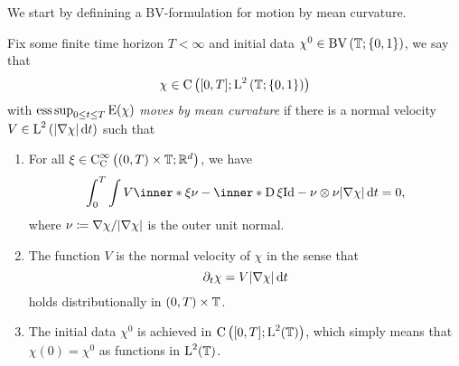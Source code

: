 We start by definining a BV-formulation for motion by mean curvature.

\begin{definition}
	\label{motion_by_mcv}
	Fix some finite time horizon $ T < \infty $ and initial data $ \chi^{ 0 }\in \operatorname{BV} \left( \operatorname{\mathbb{T}} ; \{ 0 , 1 \} \right) $, we say that 
	\begin{equation*}
		\chi \in 
		\operatorname{C} \left(
			[ 0 , T ] ; \operatorname{L}^{ 2 } \left( \operatorname{\mathbb{T}} ; \{ 0 , 1 \}  \right)
		\right)
	\end{equation*}
	with $ \operatorname*{ess\,sup}_{ 0 \leq t \leq T } \operatorname{E} ( \chi ) $ \emph{moves by mean curvature} if there is a normal velocity
	$ V \in \operatorname{L}^{ 2 } \left( \abs{ \nabla \chi } \dd{ t } \right) $ such that 
	\begin{enumerate}
		\item 
		For all 
		$ \xi \in \operatorname{C}_{ \mathrm{ C } }^{ \infty } \left( ( 0 , T ) \times \operatorname{\mathbb{T}} ; \mathbb{ R }^{ d } \right) $,
		we have
		\begin{equation}
			\label{integral_formulation_of_mcf}
			\int_{ 0 }^{ T }
				\int
					V \inner*{ \xi }{ \nu }
					- 
					\inner*{ \diff \xi }{ \mathrm{ Id } - \nu \otimes \nu }
				\abs{ \nabla \chi }
			\dd{ t }
			=
			0,
		\end{equation}
		where $ \nu \coloneqq \nabla \chi / \abs{ \nabla \chi } $ is the outer unit normal.
	\item 
	The function $ V $ is the normal velocity of $ \chi $ in the sense that 
	\begin{equation*}
		\partial_{ t } \chi
		=
		V
		\abs{ \nabla \chi }
		\dd{ t }
	\end{equation*}
	holds distributionally in $ ( 0 , T ) \times \operatorname{\mathbb{T}} $.
	\item 
	The initial data $ \chi^{ 0 } $ is achieved in $ \operatorname{C} \left( [ 0 , T ] ; \operatorname{L}^{  2 } ( \operatorname{\mathbb{T}} ) \right) $, which simply means that $ \chi ( 0 ) = \chi^{ 0 } $ as functions in $ \operatorname{L}^{ 2 } ( \operatorname{\mathbb{T}} ) $.
	\end{enumerate}
\end{definition}

